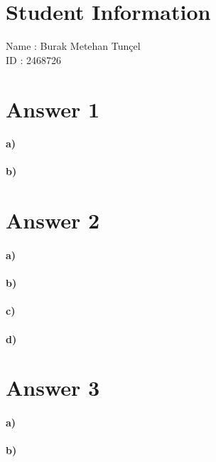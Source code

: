 \documentclass[12pt]{article}
\begin{document}
\section*{Student Information}

Name : Burak Metehan Tunçel\\

ID : 2468726\\


\section*{Answer 1}

\paragraph{a)}


\paragraph{b)}



\section*{Answer 2}

\paragraph{a)}


\paragraph{b)}


\paragraph{c)}


\paragraph{d)}



\section*{Answer 3}


\paragraph{a)}


\paragraph{b)}

\end{document}
